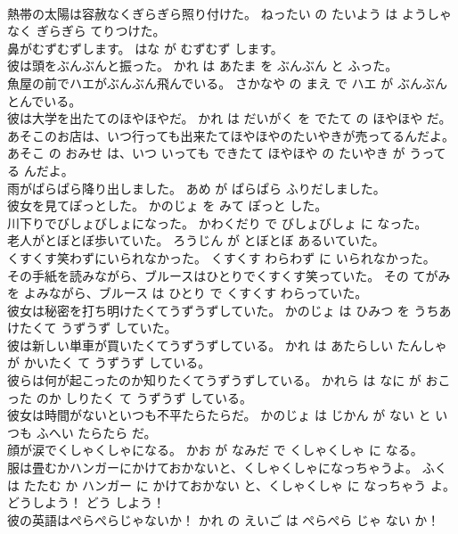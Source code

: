 \documentclass[8pt]{extreport}
\begin{document}
\begin{CJK}{UTF8}{min}
\\	熱帯の太陽は容赦なくぎらぎら照り付けた。	ねったい の たいよう は ようしゃ なく ぎらぎら てりつけた。	
\\	鼻がむずむずします。	はな が むずむず します。	
\\	彼は頭をぶんぶんと振った。	かれ は あたま を ぶんぶん と ふった。	
\\	魚屋の前でハエがぶんぶん飛んでいる。	さかなや の まえ で ハエ が ぶんぶん とんでいる。	
\\	彼は大学を出たてのほやほやだ。	かれ は だいがく を でたて の ほやほや だ。	
\\	あそこのお店は、いつ行っても出来たてほやほやのたいやきが売ってるんだよ。	あそこ の おみせ は、いつ いっても できたて ほやほや の たいやき が うってる んだよ。	
\\	雨がぱらぱら降り出しました。	あめ が ぱらぱら ふりだしました。	
\\	彼女を見てぽっとした。	かのじょ を みて ぽっと した。	
\\	川下りでびしょびしょになった。	かわくだり で びしょびしょ に なった。	
\\	老人がとぼとぼ歩いていた。	ろうじん が とぼとぼ あるいていた。	
\\	くすくす笑わずにいられなかった。	くすくす わらわず に いられなかった。	
\\	その手紙を読みながら、ブルースはひとりでくすくす笑っていた。	その てがみ を よみながら、ブルース は ひとり で くすくす わらっていた。	
\\	彼女は秘密を打ち明けたくてうずうずしていた。	かのじょ は ひみつ を うちあけたくて うずうず していた。	
\\	彼は新しい単車が買いたくてうずうずしている。	かれ は あたらしい たんしゃ が かいたく て うずうず している。	
\\	彼らは何が起こったのか知りたくてうずうずしている。	かれら は なに が おこった のか しりたく て うずうず している。	
\\	彼女は時間がないといつも不平たらたらだ。	かのじょ は じかん が ない と いつも ふへい たらたら だ。	
\\	顔が涙でくしゃくしゃになる。	かお が なみだ で くしゃくしゃ に なる。	
\\	服は畳むかハンガーにかけておかないと、くしゃくしゃになっちゃうよ。	ふく は たたむ か ハンガー に かけておかない と、くしゃくしゃ に なっちゃう よ。	
\\	どうしよう！	どう しよう！	
\\	彼の英語はぺらぺらじゃないか！	かれ の えいご は ぺらぺら じゃ ない か！	

\end{CJK}
\end{document}
